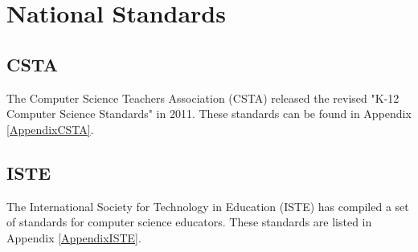\section{National Standards}
\subsection{CSTA}
The Computer Science Teachers Association (CSTA) released the revised "K-12 Computer Science Standards" in 2011. These standards can be found in Appendix \ref{AppendixCSTA}.
\subsection{ISTE}
The International Society for Technology in Education (ISTE) has compiled a set of standards for computer science educators. These standards are listed in Appendix \ref{AppendixISTE}. 

